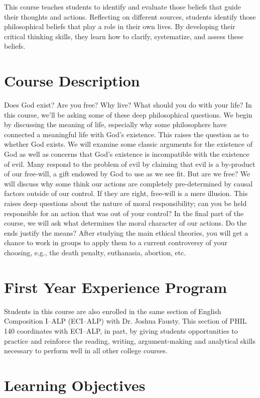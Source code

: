 \documentclass[11pt,article,oneside]{memoir}
\begin{document}
This course teaches students to identify and evaluate those beliefs that guide their thoughts and actions. Reflecting on different sources, students identify those philosophical beliefs that play a role in their own lives. By developing their critical thinking skills, they learn how to clarify, systematize, and assess these beliefs. 

\section{Course Description}

Does God exist? Are you free? Why live? What should you do with your life?  In this
course, we'll be asking some of these deep philosophical questions. We begin by discussing the meaning of life, especially why some philosophers have connected a meaningful life with God's existence. This raises the question as to whether God exists. We will examine some classic arguments for the existence of God as well as concerns that God's existence is incompatible with the existence of evil. Many respond to the problem of evil by claiming that evil is a by-product of our free-will, a gift endowed by God to use as we see fit. But are we free? We will discuss why some think our actions are completely pre-determined by causal factors outside of our control. If they are right, free-will is a mere illusion. This raises deep questions about the nature of moral responsibility; can you be held responsible for an action that was out of your control? In the final part of the course, we will ask what determines the moral character of our actions. Do the ends justify the means? After studying the main ethical theories, you will get a chance to work in groups to apply them to a current controversy of your choosing, e.g., the death penalty, euthanasia, abortion, etc.  

 \section{First Year Experience Program}
Students in this course are also enrolled in the same section of English Composition I--ALP (ECI--ALP) with Dr. Joshua Fausty.  This section of PHIL 140 coordinates with ECI--ALP, in part, by giving students opportunities to practice and reinforce the reading, writing, argument-making and analytical skills necessary to perform well in all other college courses. 



\section{Learning Objectives}
\end{document}
